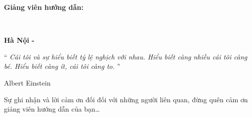 \documentclass[
12pt,
oneside,
english,
doublespacing,
nolistspacing,
liststotoc,
parskip,
headsepline,
chapterinoneline,
]{MastersDoctoralThesis}
\begin{document}
\begin{titlepage}
\begin{center}
		\begin{minipage}[t]{0.49\textwidth}
			\begin{flushright} \large \bfseries
				Giảng viên hướng dẫn:\;
			\end{flushright}
		\end{minipage}
		\begin{minipage}[t]{0.5\textwidth}
			\begin{flushleft} \large \bfseries
				\supname\\
				\supnamee
			\end{flushleft}
		\end{minipage}
	
		\vfill
		
		\textbf{Hà Nội - \the\year{}}
	\end{center}
\end{titlepage}



\vspace*{0.2\textheight}

\noindent\enquote{\itshape 
	Cái tôi và sự hiểu biết tỷ lệ nghịch với nhau. Hiểu biết càng nhiều cái tôi càng bé. Hiểu biết càng ít, cái tôi càng to.
}\bigbreak

\hfill Albert Einstein



\begin{acknowledgements}
	\addchaptertocentry{\acknowledgementname}
	\thispagestyle{empty}
	Sự ghi nhận và lời cảm ơn đối đối với những người liên quan, đừng quên cảm ơn giảng viên hướng dẫn của bạn\ldots
\end{acknowledgements}


%

\begin{spacing}{1.15}
	\tableofcontents 	%
\end{spacing}
\end{document}

